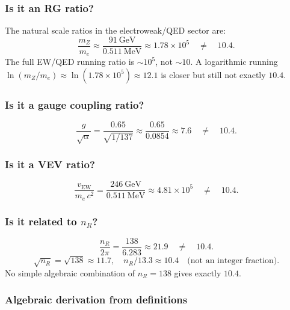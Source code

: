\documentclass[12pt]{article}
\theoremstyle{definition}
\theoremstyle{remark}
\begin{document}
\subsubsection{Is it an RG ratio?}

The natural scale ratios in the electroweak/QED sector are:
\begin{equation}
  \frac{m_Z}{m_e} \approx \frac{91\ \text{GeV}}{0.511\ \text{MeV}} \approx 1.78\times 10^5
  \quad\neq\quad 10.4.
\end{equation}
The full EW/QED running ratio is $\sim 10^5$, not $\sim 10$.
A logarithmic running $\ln(m_Z/m_e) \approx \ln(1.78\times10^5) \approx 12.1$
is closer but still not exactly $10.4$.

\subsubsection{Is it a gauge coupling ratio?}

\begin{equation}
  \frac{g}{\sqrt{\alpha}} = \frac{0.65}{\sqrt{1/137}} \approx \frac{0.65}{0.0854} \approx 7.6
  \quad\neq\quad 10.4.
\end{equation}

\subsubsection{Is it a VEV ratio?}

\begin{equation}
  \frac{v_{\text{EW}}}{m_e\,c^2} = \frac{246\ \text{GeV}}{0.511\ \text{MeV}}
  \approx 4.81\times 10^5 \quad\neq\quad 10.4.
\end{equation}

\subsubsection{Is it related to $n_R$?}

\begin{equation}
  \frac{n_R}{2\pi} = \frac{138}{6.283} \approx 21.9 \quad\neq\quad 10.4.
\end{equation}
\begin{equation}
  \sqrt{n_R} = \sqrt{138} \approx 11.7,
  \quad
  n_R / 13.3 \approx 10.4 \quad\text{(not an integer fraction)}.
\end{equation}
No simple algebraic combination of $n_R = 138$ gives exactly $10.4$.

\subsubsection{Algebraic derivation from definitions}
\end{document}
